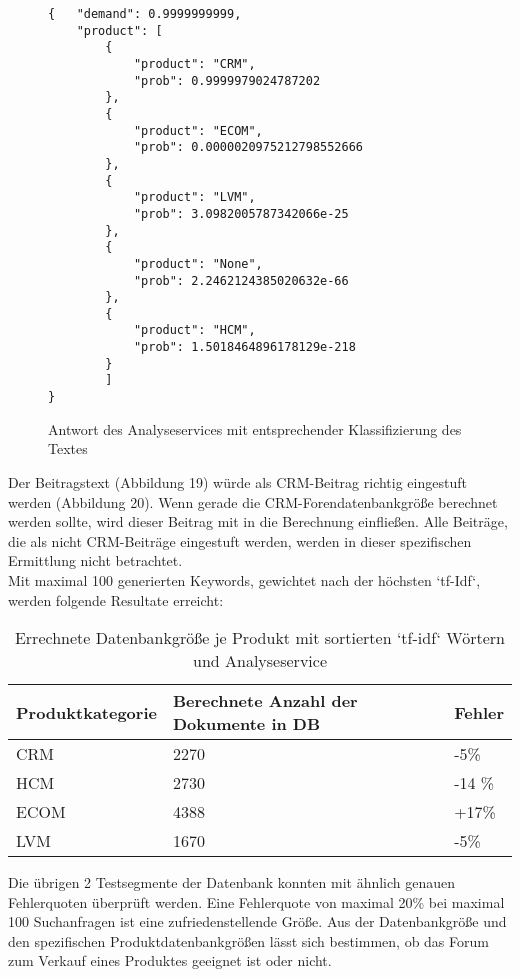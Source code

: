 \newpage

\begin{figure}[h!]
\begin{lstlisting}[language=HTML5]
{   "demand": 0.9999999999,
    "product": [
        {
            "product": "CRM",
            "prob": 0.9999979024787202
        },
        {
            "product": "ECOM",
            "prob": 0.0000020975212798552666
        },
        {
            "product": "LVM",
            "prob": 3.0982005787342066e-25
        },
        {
            "product": "None",
            "prob": 2.2462124385020632e-66
        },
        {
            "product": "HCM",
            "prob": 1.5018464896178129e-218
        }
		]
}
\end{lstlisting}
\caption{Antwort des Analyseservices mit entsprechender Klassifizierung des Textes}
\end{figure}

Der Beitragstext (Abbildung 19) würde als CRM-Beitrag richtig eingestuft werden (Abbildung 20). Wenn gerade die CRM-Forendatenbankgröße berechnet werden sollte, wird dieser Beitrag mit in die Berechnung einfließen. Alle Beiträge, die als nicht CRM-Beiträge eingestuft werden, werden in dieser spezifischen Ermittlung nicht betrachtet.\\
Mit maximal 100 generierten Keywords, gewichtet nach der höchsten `tf-Idf`, werden folgende Resultate erreicht:

\begin{table}[h!]
\begin{tabular}{ | p{3cm} | l | l |}
\hline
\textbf{Produktkategorie} & \textbf{Berechnete Anzahl der Dokumente in DB} & \textbf{Fehler} \\ \hline
CRM & 2270 & -5\% \\ \hline
HCM & 2730 & -14 \% \\ \hline
ECOM & 4388 & +17\% \\ \hline
LVM & 1670 & -5\% \\ \hline
\end{tabular}
\caption{Errechnete Datenbankgröße je Produkt mit sortierten `tf-idf` Wörtern und Analyseservice}
\end{table}

Die übrigen 2 Testsegmente der Datenbank konnten mit ähnlich genauen Fehlerquoten überprüft werden.
Eine Fehlerquote von maximal 20\% bei maximal 100 Suchanfragen ist eine zufriedenstellende Größe. Aus der Datenbankgröße und den spezifischen Produktdatenbankgrößen lässt sich bestimmen, ob das Forum zum Verkauf eines Produktes geeignet ist oder nicht.
\newpage